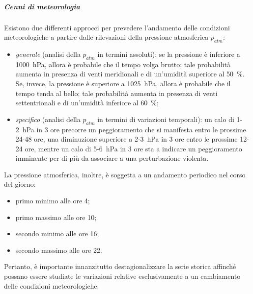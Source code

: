 \subparagraph{Cenni di meteorologia} Esistono due differenti approcci per prevedere l'andamento delle condizioni meteorologiche a partire dalle rilevazioni della pressione atmosferica $p_{atm}$:
\begin{itemize}
	\item \textit{generale} (analisi della $p_{atm}$ in termini assoluti): se la pressione è inferiore a \SI{1000}{\hecto\pascal}, allora è probabile che il tempo volga brutto; tale probabilità aumenta in presenza di venti meridionali e di un'umidità superiore al \SI{50}{\percent}. Se, invece, la pressione è superiore a \SI{1025}{\hecto\pascal}, allora è probabile che il tempo tenda al bello; tale probabilità aumenta in presenza di venti settentrionali e di un'umidità inferiore al \SI{60}{\percent};
	\item \textit{specifico} (analisi della $p_{atm}$ in termini di variazioni temporali): un calo di 1-\SI{2}{\hecto\pascal} in 3 ore precorre un peggioramento che si manifesta entro le prossime 24-48 ore, una diminuzione superiore a 2-\SI{3}{\hecto\pascal} in 3 ore entro le prossime 12-24 ore, mentre un calo di 5-\SI{6}{\hecto\pascal} in 3 ore sta a indicare un peggioramento imminente per di più da associare a una perturbazione violenta. 
\end{itemize}
La pressione atmosferica, inoltre, è soggetta a un andamento periodico nel corso del giorno:
\begin{itemize}
	\item primo minimo alle ore 4;
	\item primo massimo alle ore 10;
	\item secondo minimo alle ore 16;
	\item secondo massimo alle ore 22.
\end{itemize}
Pertanto, è importante innanzitutto destagionalizzare la serie storica affinché possano essere studiate le variazioni relative esclusivamente a un cambiamento delle condizioni meteorologiche.

